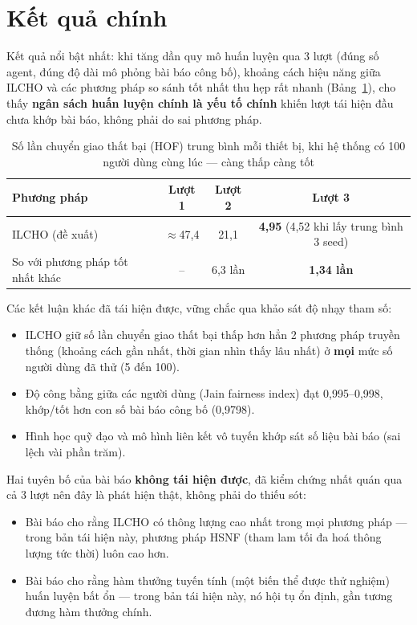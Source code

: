 \documentclass[12pt,a4paper]{article}
\begin{document}
\section{Kết quả chính}

Kết quả nổi bật nhất: khi tăng dần quy mô huấn luyện qua 3 lượt (đúng số agent, đúng độ dài
mô phỏng bài báo công bố), khoảng cách hiệu năng giữa ILCHO và các phương pháp so sánh tốt
nhất thu hẹp rất nhanh (Bảng~\ref{tab:hof}), cho thấy \textbf{ngân sách huấn luyện chính là yếu
tố chính} khiến lượt tái hiện đầu chưa khớp bài báo, không phải do sai phương pháp.

\begin{table}[h]
\centering
\caption{Số lần chuyển giao thất bại (HOF) trung bình mỗi thiết bị, khi hệ thống có 100 người
dùng cùng lúc — càng thấp càng tốt}
\label{tab:hof}
\begin{tabular}{lccc}
\toprule
\textbf{Phương pháp} & \textbf{Lượt 1} & \textbf{Lượt 2} & \textbf{Lượt 3} \\
\midrule
ILCHO (đề xuất)        & $\approx$47,4 & 21,1 & \textbf{4,95} (4,52 khi lấy trung bình 3 seed) \\
So với phương pháp tốt nhất khác & --   & 6,3 lần & \textbf{1,34 lần} \\
\bottomrule
\end{tabular}
\end{table}

Các kết luận khác đã tái hiện được, vững chắc qua khảo sát độ nhạy tham số:

\begin{itemize}[leftmargin=1.2em]
  \item ILCHO giữ số lần chuyển giao thất bại thấp hơn hẳn 2 phương pháp truyền thống
        (khoảng cách gần nhất, thời gian nhìn thấy lâu nhất) ở \textbf{mọi} mức số người dùng
        đã thử (5 đến 100).
  \item Độ công bằng giữa các người dùng (Jain fairness index) đạt 0,995--0,998, khớp/tốt hơn
        con số bài báo công bố (0,9798).
  \item Hình học quỹ đạo và mô hình liên kết vô tuyến khớp sát số liệu bài báo (sai lệch vài
        phần trăm).
\end{itemize}

Hai tuyên bố của bài báo \textbf{không tái hiện được}, đã kiểm chứng nhất quán qua cả 3 lượt
nên đây là phát hiện thật, không phải do thiếu sót:

\begin{itemize}[leftmargin=1.2em]
  \item Bài báo cho rằng ILCHO có thông lượng cao nhất trong mọi phương pháp — trong bản tái
        hiện này, phương pháp HSNF (tham lam tối đa hoá thông lượng tức thời) luôn cao hơn.
  \item Bài báo cho rằng hàm thưởng tuyến tính (một biến thể được thử nghiệm) huấn luyện bất
        ổn — trong bản tái hiện này, nó hội tụ ổn định, gần tương đương hàm thưởng chính.
\end{itemize}
\end{document}
